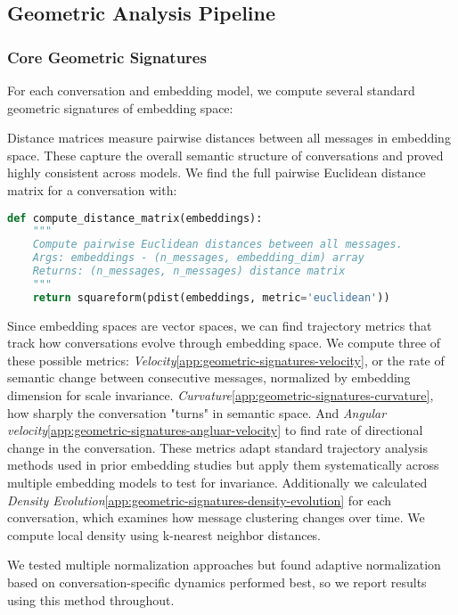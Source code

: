 \documentclass[11pt,letterpaper]{article}
\begin{document}
\subsection{Geometric Analysis Pipeline}

\subsubsection{Core Geometric Signatures}

For each conversation and embedding model, we compute several standard geometric signatures of embedding space:

Distance matrices measure pairwise distances between all messages in embedding space. These capture the overall semantic structure of conversations and proved highly consistent across models. We find the full pairwise Euclidean distance matrix for a conversation with:

\begin{lstlisting}[language=Python, basicstyle=\small]
def compute_distance_matrix(embeddings):
    """
    Compute pairwise Euclidean distances between all messages.
    Args: embeddings - (n_messages, embedding_dim) array
    Returns: (n_messages, n_messages) distance matrix
    """
    return squareform(pdist(embeddings, metric='euclidean'))
\end{lstlisting}

Since embedding spaces are vector spaces, we can find trajectory metrics that track how conversations evolve through embedding space. We compute three of these possible metrics: \textit{Velocity}\ref{app:geometric-signatures-velocity}, or the rate of semantic change between consecutive messages, normalized by embedding dimension for scale invariance. \textit{Curvature}\ref{app:geometric-signatures-curvature}, how sharply the conversation "turns" in semantic space. And \textit{Angular velocity}\ref{app:geometric-signatures-angluar-velocity} to find rate of directional change in the conversation. These metrics adapt standard trajectory analysis methods used in prior embedding studies \citep{brinberg2024dynamic, palominos2024trajectories} but apply them systematically across multiple embedding models to test for invariance.
Additionally we calculated \textit{Density Evolution}\ref{app:geometric-signatures-density-evolution} for each conversation, which examines how message clustering changes over time. We compute local density using k-nearest neighbor distances.

We tested multiple normalization approaches but found adaptive normalization based on conversation-specific dynamics performed best, so we report results using this method throughout.
\end{document}
